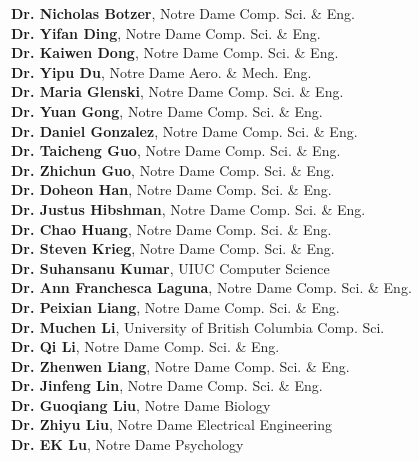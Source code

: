 \documentclass[10pt]{article}
\newenvironment{myindentpar}[1]%
{\begin{list}{}%
         {\setlength{\leftmargin}{#1}}%
         \item[]%
}
{\end{list}}
\newcounter{list}
\begin{document}
\begin{myindentpar}{0.75cm}
{\textcolor{white}{.}{\bf Dr. Nicholas Botzer}, Notre Dame Comp. Sci. \& Eng. \\
\textcolor{white}{.}{\bf Dr. Yifan Ding}, Notre Dame Comp. Sci. \& Eng. \\
\textcolor{white}{.}{\bf Dr. Kaiwen Dong}, Notre Dame Comp. Sci. \& Eng. \\
\textcolor{white}{.}{\bf Dr. Yipu Du}, Notre Dame Aero. \& Mech. Eng. \\
\textcolor{white}{.}{\bf Dr. Maria Glenski}, Notre Dame Comp. Sci. \& Eng. \\
\textcolor{white}{.}{\bf Dr. Yuan Gong}, Notre Dame Comp. Sci. \& Eng. \\
\textcolor{white}{.}{\bf Dr. Daniel Gonzalez}, Notre Dame Comp. Sci. \& Eng. \\
\textcolor{white}{.}{\bf Dr. Taicheng Guo}, Notre Dame Comp. Sci. \& Eng. \\
\textcolor{white}{.}{\bf Dr. Zhichun Guo}, Notre Dame Comp. Sci. \& Eng. \\
\textcolor{white}{.}{\bf Dr. Doheon Han}, Notre Dame Comp. Sci. \& Eng. \\
\textcolor{white}{.}{\bf Dr. Justus Hibshman}, Notre Dame Comp. Sci. \& Eng. \\
\textcolor{white}{.}{\bf Dr. Chao Huang}, Notre Dame Comp. Sci. \& Eng. \\
\textcolor{white}{.}{\bf Dr. Steven Krieg}, Notre Dame Comp. Sci. \& Eng. \\
\textcolor{white}{.}{\bf Dr. Suhansanu Kumar}, UIUC Computer Science \\
\textcolor{white}{.}{\bf Dr. Ann Franchesca Laguna}, Notre Dame Comp. Sci. \& Eng. \\
\textcolor{white}{.}{\bf Dr. Peixian Liang}, Notre Dame Comp. Sci. \& Eng. \\
\textcolor{white}{.}{\bf Dr. Muchen Li}, University of British Columbia Comp. Sci. \\
\textcolor{white}{.}{\bf Dr. Qi Li}, Notre Dame Comp. Sci. \& Eng. \\
\textcolor{white}{.}{\bf Dr. Zhenwen Liang}, Notre Dame Comp. Sci. \& Eng. \\
\textcolor{white}{.}{\bf Dr. Jinfeng Lin}, Notre Dame Comp. Sci. \& Eng. \\
\textcolor{white}{.}{\bf Dr. Guoqiang Liu}, Notre Dame Biology \\
\textcolor{white}{.}{\bf Dr. Zhiyu Liu}, Notre Dame Electrical Engineering \\
\textcolor{white}{.}{\bf Dr. EK Lu}, Notre Dame Psychology \\
}
\end{myindentpar}
\end{document}
